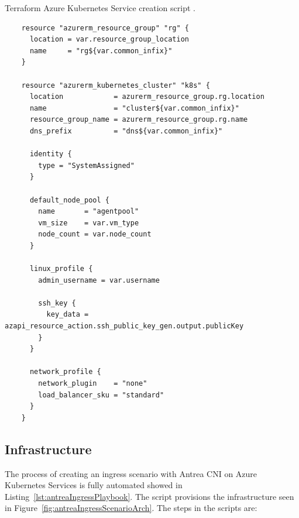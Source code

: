 \begin{listing}[htb]
  \centering
  \caption{Terraform Azure Kubernetes Service creation script \cite{AKS}.}
  \begin{verbatim}
    resource "azurerm_resource_group" "rg" {
      location = var.resource_group_location
      name     = "rg${var.common_infix}"
    }

    resource "azurerm_kubernetes_cluster" "k8s" {
      location            = azurerm_resource_group.rg.location
      name                = "cluster${var.common_infix}"
      resource_group_name = azurerm_resource_group.rg.name
      dns_prefix          = "dns${var.common_infix}"

      identity {
        type = "SystemAssigned"
      }

      default_node_pool {
        name       = "agentpool"
        vm_size    = var.vm_type
        node_count = var.node_count
      }

      linux_profile {
        admin_username = var.username

        ssh_key {
          key_data = azapi_resource_action.ssh_public_key_gen.output.publicKey
        }
      }

      network_profile {
        network_plugin    = "none"
        load_balancer_sku = "standard"
      }
    }
  \end{verbatim}
  \label{lst:terraformScript}
\end{listing}


\subsection{Infrastructure}
\label{sec:infra}

The process of creating an ingress scenario with Antrea CNI on Azure Kubernetes Services is fully automated showed in Listing~\ref{lst:antreaIngressPlaybook}. The script provisions the infrastructure seen in Figure~\ref{fig:antreaIngressScenarioArch}. The steps in the scripts are: 


